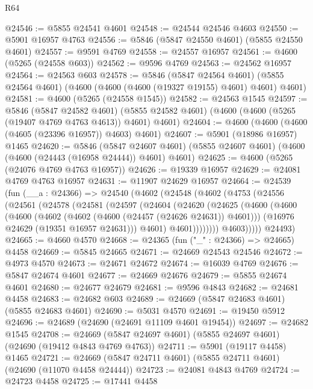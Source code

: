 \begin{lexlean}{R64}
\begin{coremodule}
@24546 := @5855 @24541 @4601
@24548 := @24544 @24546 @4603
@24550 := @5901 @16957 @4763
@24556 := @5846 (@5847 @24550 @4601) (@5855 @24550 @4601)
@24557 := @9591 @4769
@24558 := @24557 @16957
@24561 := @4600 (@5265 (@24558 @603))
@24562 := @9596 @4769
@24563 := @24562 @16957
@24564 := @24563 @603
@24578 := @5846
    (@5847 @24564 @4601)
    (@5855 @24564 @4601)
    (@4600 (@4600 (@4600 (@19327 @19155) @4601) @4601) @4601)
@24581 := @4600 (@5265 (@24558 @1545))
@24582 := @24563 @1545
@24597 := @5846
    (@5847 @24582 @4601)
    (@5855 @24582 @4601)
    (@4600 (@4600 (@5265 (@19407 @4769 @4763 @4613)) @4601) @4601)
@24604 := @4600 (@4600 (@4600 (@4605 (@23396 @16957)) @4603) @4601)
@24607 := @5901 (@18986 @16957) @1465
@24620 := @5846
    (@5847 @24607 @4601)
    (@5855 @24607 @4601)
    (@4600 (@4600 (@24443 (@16958 @24444)) @4601) @4601)
@24625 := @4600 (@5265 (@24076 @4769 @4763 @16957))
@24626 := @19339 @16957
@24629 := @24081 @4769 @4763 @16957
@24631 := @11907 @24629 @16957
@24664 := @24539
    (fun (__a : @24366) =>
    @24540
      (@4602
        (@24548
          (@4602
            (@4753
              (@24556
                (@24561
                  (@24578
                    (@24581
                      (@24597
                        (@24604
                          (@24620
                            (@24625
                              (@4600
                                (@4600
                                  (@4600
                                    (@4602 (@4602 (@4600 (@24457 (@24626 @24631)) @4601)))
                                    (@16976 @24629 (@19351 @16957 @24631)))
                                  @4601)
                                @4601))))))))
                @4603)))))
      @24493)
@24665 := @4660 @4570
@24668 := @24365 (fun ("_" : @24366) => @24665) @4458
@24669 := @5845 @24665
@24671 := @24669 @24543 @24546
@24672 := @4973 @4570
@24673 := @24671 @24672
@24674 := @16039 @4769
@24676 := @5847 @24674 @4601
@24677 := @24669 @24676
@24679 := @5855 @24674 @4601
@24680 := @24677 @24679
@24681 := @9596 @4843
@24682 := @24681 @4458
@24683 := @24682 @603
@24689 := @24669 (@5847 @24683 @4601) (@5855 @24683 @4601)
@24690 := @5031 @4570
@24691 := @19450 @5912
@24696 := @24689 (@24690 (@24691 @11109 @4601 @19454))
@24697 := @24682 @1545
@24708 := @24669 (@5847 @24697 @4601) (@5855 @24697 @4601) (@24690 (@19412 @4843 @4769 @4763))
@24711 := @5901 (@19117 @4458) @1465
@24721 := @24669 (@5847 @24711 @4601) (@5855 @24711 @4601) (@24690 (@11070 @4458 @24444))
@24723 := @24081 @4843 @4769
@24724 := @24723 @4458
@24725 := @17441 @4458

\end{coremodule}
\end{lexlean}
